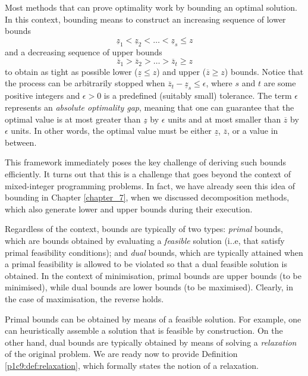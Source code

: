 Most methods that can prove optimality work by bounding an optimal solution. In this context, bounding means to construct an increasing sequence of lower bounds
%
\begin{equation*}
	\underline{z}_1 < \underline{z}_2 < \dots < \underline{z}_s \leq z	
\end{equation*}
%
and a decreasing sequence of upper bounds
%
\begin{equation*}
	\overline{z}_1 > \overline{z}_2 > \dots > \overline{z}_t \geq z
\end{equation*}
%
to obtain as tight as possible lower ($\underline{z} \leq z$) and upper ($\overline{z} \geq z$) bounds. Notice that the process can be arbitrarily stopped when $\overline{z}_t - \underline{z}_s \leq \epsilon$, where $s$ and $t$ are some positive integers and $\epsilon > 0$ is a predefined (suitably small) tolerance. The term $\epsilon$ represents an \emph{absolute optimality gap}, meaning that one can guarantee that the optimal value is at most greater than $\underline{z}$ by $\epsilon$ units and at most smaller than $\overline{z}$ by $\epsilon$ units. In other words, the optimal value must be either $\underline{z}$, $\overline{z}$, or a value in between.

This framework immediately poses the key challenge of deriving such bounds efficiently. It turns out that this is a challenge that goes beyond the context of mixed-integer programming problems. In fact, we have already seen this idea of bounding in Chapter \ref{chapter_7}, when we discussed decomposition methods, which also generate lower and upper bounds during their execution.

Regardless of the context, bounds are typically of two types: \emph{primal} bounds, which are bounds obtained by evaluating a \emph{feasible} solution (i..e, that satisfy primal feasibility conditions); and \emph{dual} bounds, which are typically attained when a primal feasibility is allowed to be violated so that a dual feasible solution is obtained. In the context of minimisation, primal bounds are upper bounds (to be minimised), while dual bounds are lower bounds (to be maximised). Clearly, in the case of maximisation, the reverse holds. 

Primal bounds can be obtained by means of a feasible solution. For example, one can heuristically assemble a solution that is feasible by construction. On the other hand, dual bounds are typically obtained by means of solving a \emph{relaxation} of the original problem. We are ready now to provide Definition \ref{p1c9:def:relaxation}, which formally states the notion of a relaxation.


